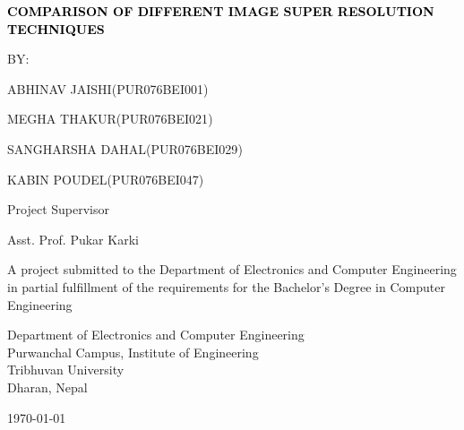 \newpage
\thispagestyle{empty}
\begin{titlepage}
    \centering
{\fontsize{12pt}{14pt}\bfseries\textcolor{black}{COMPARISON OF DIFFERENT IMAGE SUPER RESOLUTION TECHNIQUES}\par}
\vspace{2.0cm}
       {BY:} \par {ABHINAV JAISHI}({PUR076BEI001})
            \par {MEGHA THAKUR}({PUR076BEI021})
            \par {SANGHARSHA DAHAL}({PUR076BEI029})
            \par {KABIN POUDEL}({PUR076BEI047})
       \vspace{2.0cm}\par
    Project Supervisor\par
    Asst. Prof. Pukar Karki\par
    \vspace{2.0cm}
    {A project submitted to the Department of Electronics and Computer Engineering in partial fulfillment of the requirements for the Bachelor’s Degree in Computer Engineering}\par
        \vspace{2.0cm}\par

    {Department of Electronics and Computer Engineering\\ Purwanchal Campus, Institute of Engineering \\ Tribhuvan University\\ Dharan, Nepal}\par
        \vspace{2.0cm}\par
        
        \today
\end{titlepage}